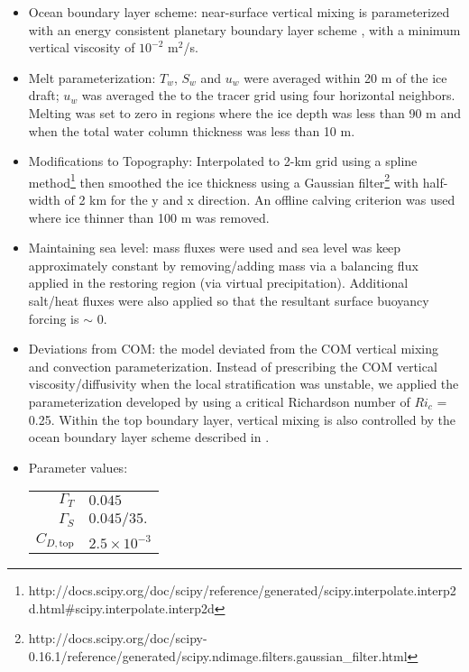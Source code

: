 \documentclass[11pt]{article} %
\begin{document}
\begin{itemize}
\item Ocean boundary layer scheme: near-surface vertical mixing is parameterized with an energy consistent planetary boundary layer scheme \citep{Reichl2018}, with a minimum vertical viscosity of $10^{-2}$ m$^2$/s.

\item Melt parameterization: $T_w$, $S_w$ and $u_w$ were averaged within 20 m of the ice draft; $u_w$ was averaged the to the tracer grid using four horizontal neighbors. Melting was set to zero in regions where the ice depth was less than 90 m and when the total water column thickness was less than 10 m.

\item Modifications to Topography: Interpolated to 2-km grid using a spline method\footnote{http://docs.scipy.org/doc/scipy/reference/generated/scipy.interpolate.interp2d.html\#scipy.interpolate.interp2d} then smoothed the ice thickness using a Gaussian filter\footnote{http://docs.scipy.org/doc/scipy-0.16.1/reference/generated/scipy.ndimage.filters.gaussian\_filter.html} with half-width of 2 km for the y and x direction. An offline calving criterion was used where ice thinner than 100 m was removed.

\item Maintaining sea level: mass fluxes were used and sea level was keep approximately constant by removing/adding mass via a balancing flux applied in the restoring region (via virtual precipitation). Additional salt/heat fluxes were also applied so that the resultant surface buoyancy forcing is $\sim$ 0.

\item Deviations from COM: the model deviated from the COM vertical mixing and convection parameterization. Instead of prescribing the COM vertical viscosity/diffusivity when the local stratification was unstable, we applied the parameterization developed by \cite{Jackson2008} using a critical Richardson number of $Ri_c$ = 0.25. Within the top boundary layer, vertical mixing is also controlled by the ocean boundary layer scheme described in \cite{Reichl2018}.

\item Parameter values:

\begin{tabular}{rl}
$\Gamma_T$ & $0.045$ \\
$\Gamma_S$ & $0.045/35.$ \\
$C_{D,\textrm{top}}$ & $2.5 \times 10^{-3}$
\end{tabular}
\end{itemize}
\end{document}
